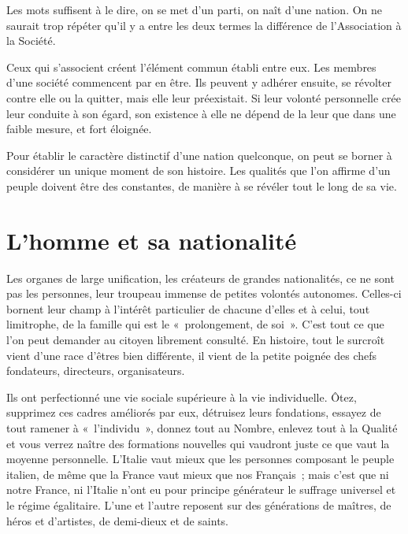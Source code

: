 \documentclass[french,twoside]{book} %
\newcommand{\astermono}{\medskip\centerline{\color{rubric}\large\selectfont{\syms ✻}}\medskip\par}%
\begin{document}
\astermono

\noindent Les mots suffisent à le dire, on se met d’un parti, on naît d’une nation. On ne saurait trop répéter qu’il y a entre les deux termes la différence de l’Association à la Société.\par
Ceux qui s’associent créent l’élément commun établi entre eux. Les membres d’une société commencent par en être. Ils peuvent y adhérer ensuite, se révolter contre elle ou la quitter, mais elle leur préexistait. Si leur volonté personnelle crée leur conduite à son égard, son existence à elle ne dépend de la leur que dans une faible mesure, et fort éloignée.\par

\astermono

\noindent Pour établir le caractère distinctif d’une nation quelconque, on peut se borner à considérer un unique moment de son histoire. Les qualités que l’on affirme d’un peuple doivent être des constantes, de manière à se révéler tout le long de sa vie.
\section[L’homme et sa nationalité]{L’homme et sa nationalité}
\noindent Les organes de large unification, les créateurs de grandes nationalités, ce ne sont pas les personnes, leur troupeau immense de petites volontés autonomes. Celles-ci bornent leur champ à l’intérêt particulier de chacune d’elles et à celui, tout limitrophe, de la famille qui est le « prolongement, de soi ». C’est tout ce que l’on peut demander au citoyen librement consulté. En histoire, tout le surcroît vient d’une race d’êtres bien différente, il vient de la petite poignée des chefs fondateurs, directeurs, organisateurs.\par
Ils ont perfectionné une vie sociale supérieure à la vie individuelle. Ôtez, supprimez ces cadres améliorés par eux, détruisez leurs fondations, essayez de tout ramener à « l’individu », donnez tout au Nombre, enlevez tout à la Qualité et vous verrez naître des formations nouvelles qui vaudront juste ce que vaut la moyenne personnelle. L’Italie vaut mieux que les personnes composant le peuple italien, de même que la France vaut mieux que nos Français ; mais c’est que ni notre France, ni l’Italie n’ont eu pour principe générateur le suffrage universel et le régime égalitaire. L’une et l’autre reposent sur des générations de maîtres, de héros et d’artistes, de demi-dieux et de saints.\par
\end{document}
